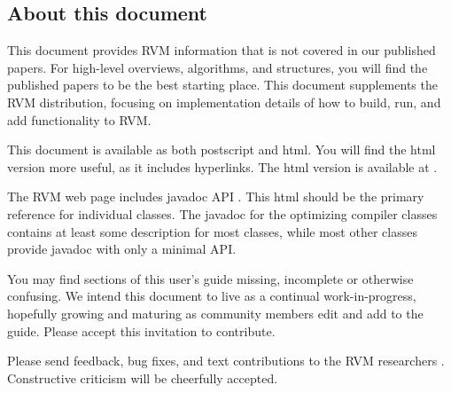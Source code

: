 \JikesTMFooter

\JavaTMFooter

\subsection {About this document}

This document provides RVM information that is not covered in
our published papers.  For high-level overviews, algorithms, and
structures, you will find the published papers to be the best starting
place. This document supplements
the RVM distribution, focusing on implementation
details of how to build, run, and add functionality to RVM.

This document is available as both postscript and html.  You will find the
html version more useful, as it includes hyperlinks. The html version is
available at 
\xlink{{\tt \RVMUserGuideURL}}{\RVMUserGuideURL}.

The RVM web page includes 
javadoc API 
. 
This html should be the
primary reference for individual classes.  The javadoc for the optimizing
compiler classes contains at least some description for most classes,
while most other classes provide javadoc with only a minimal API.

You may find sections of this user's guide missing, incomplete or
otherwise confusing. We intend this document to live as a continual
work-in-progress, hopefully growing and maturing as community members
edit and add to the guide.  Please accept this invitation to
contribute.

Please send feedback, bug fixes, and text contributions to the RVM
researchers 
.  
Constructive criticism will be cheerfully 
accepted. 
